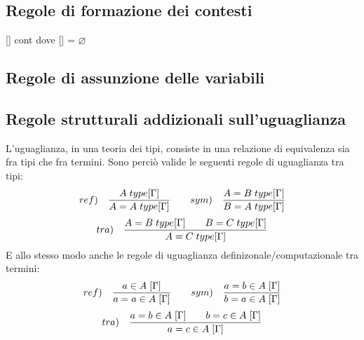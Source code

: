 \documentclass[10pt,a4paper, italian]{book}
\begin{document}
{{{\subsection{Regole di formazione dei contesti}
\label{subsec:formazione-contesti}
\begin{center} [\hspace{0.1cm}] cont \quad dove [\hspace{0.1cm}] = $\varnothing$ \end{center}
\begin{prooftree}
\end{prooftree}
\subsection{Regole di assunzione delle variabili}
\label{subsec:assunzione-variabili}
\begin{prooftree}
\end{prooftree}
\subsection{Regole strutturali addizionali sull'uguaglianza}
\label{subsec:uguaglianza}
L'uguaglianza, in una teoria dei tipi, consiste in una relazione di equivalenza sia fra tipi che fra termini. Sono perci\`o valide le seguenti regole di uguaglianza tra tipi:
\[ ref) \quad \frac{A\hspace{0.1cm}type[\Gamma]}{A=A\hspace{0.1cm}type[\Gamma]} \qquad sym) \quad \frac{A=B\hspace{0.1cm}type[\Gamma]}{B=A\hspace{0.1cm}type[\Gamma]} \]
\[ tra) \quad \frac{A=B\hspace{0.1cm}type[\Gamma] \qquad B=C\hspace{0.1cm}type[\Gamma]}{A=C\hspace{0.1cm}type[\Gamma]} \]
E allo stesso modo anche le regole di uguaglianza definizonale/computazionale tra termini:
\[ ref) \quad \frac{a \in A\hspace{0.1cm}[\Gamma]}{a=a \in A\hspace{0.1cm}[\Gamma]} \qquad sym) \quad \frac{a=b\in A \hspace{0.1cm}[\Gamma]}{b=a \in A\hspace{0.1cm}[\Gamma]} \]
\[ tra) \quad \frac{a=b \in A\hspace{0.1cm}[\Gamma] \qquad b=c \in A\hspace{0.1cm}[\Gamma]}{a=c \in A\hspace{0.1cm}[\Gamma]} \]
}}}
\end{document}
